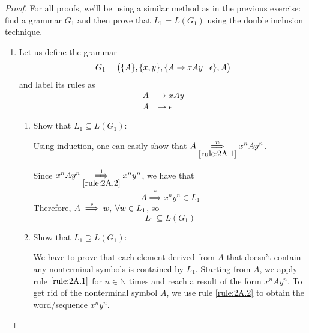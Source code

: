 \documentclass[11pt]{article}
\begin{document}
    \begin{proof}
    For all proofs, we'll be using a similar method as in the previous exercise: find a grammar
    $G_1$ and then prove that $L_1 = L(G_1)$ using the double inclusion technique.
    \begin{enumerate}
        \item Let us define the grammar 
            \begin{equation}\label{grammar:2.A}
                G_1 = \big(\{A\}, \{x, y\}, \{A \to xAy \hspace{0.25em}|\hspace{0.25em} \epsilon\}, A\big)
            \end{equation}
        and label its rules as
        \begin{align}
            A &\to xAy \label{rule:2A.1} \\
            A &\to \epsilon \label{rule:2A.2}
        \end{align}
        \begin{enumerate}
            \item Show that $L_1 \subseteq L(G_1)$:

            Using induction, one can easily show that 
            $A \overset{n}{\underset{\eqref{rule:2A.1}}{\implies}} x^nAy^n$. 
            
            Since $x^nAy^n \overset{1}{\underset{\eqref{rule:2A.2}}{\implies}} x^ny^n$,
            we have that
            \begin{equation}
                A \overset{*}{\implies} x^ny^n \in L_1
            \end{equation}
            Therefore, $A \overset{*}{\implies} w, \hspace{0.25em} \forall w \in L_1$, so
            \begin{equation}\label{incl:2A.1}
                L_1 \subseteq L(G_1)
            \end{equation}

            \vspace{1em}

            \item Show that $L_1 \supseteq L(G_1)$:

            We have to prove that each element derived from $A$ that doesn't contain
            any nonterminal symbols is contained by $L_1$. Starting from $A$, we apply
            rule $\eqref{rule:2A.1}$ for $n \in \mathbb{N}$ times and reach a result
            of the form $x^nAy^n$. To get rid of the nonterminal symbol $A$, we use
            rule \eqref{rule:2A.2} to obtain the word/sequence $x^ny^n$.


\end{enumerate}
\end{enumerate}
\end{proof}
\end{document}
